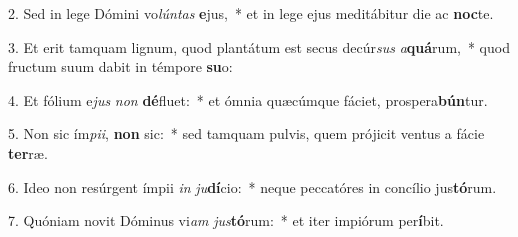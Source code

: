 2. Sed in lege Dómini vo\textit{lún}\textit{tas} \textbf{e}jus,~*  et in lege ejus meditábitur die ac \textbf{noc}te.\

3. Et erit tamquam lignum, quod plantátum est secus decúr\textit{sus} \textit{a}\textbf{quá}rum,~*  quod fructum suum dabit in témpore \textbf{su}o:\

4. Et fólium e\textit{jus} \textit{non} \textbf{dé}fluet:~*  et ómnia quæcúmque fáciet, prospera\textbf{bún}tur.\

5. Non sic ím\textit{pi}\textit{i}, \textbf{non} sic:~*  sed tamquam pulvis, quem prójicit ventus a fácie \textbf{ter}ræ.\

6. Ideo non resúrgent ímpii \textit{in} \textit{ju}\textbf{dí}cio:~*  neque peccatóres in concílio jus\textbf{tó}rum.\

7. Quóniam novit Dóminus vi\textit{am} \textit{jus}\textbf{tó}rum:~*  et iter impiórum per\textbf{í}bit.\

